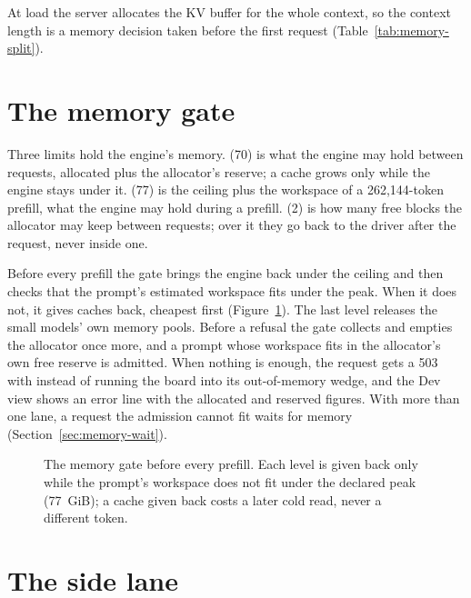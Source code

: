 At load the server allocates the KV buffer for the whole context, so the context length is a memory decision taken before the first request (Table~\ref{tab:memory-split}).

\section{The memory gate}\label{sec:memory-gate}

Three limits hold the engine's memory.  (70) is what the engine may hold between requests, allocated plus the allocator's reserve; a cache grows only while the engine stays under it.  (77) is the ceiling plus the workspace of a 262,144-token prefill, what the engine may hold during a prefill.  (2) is how many free blocks the allocator may keep between requests; over it they go back to the driver after the request, never inside one.

Before every prefill the gate brings the engine back under the ceiling and then checks that the prompt's estimated workspace fits under the peak. When it does not, it gives caches back, cheapest first (Figure~\ref{fig:memory-gate}). The last level releases the small models' own memory pools. Before a refusal the gate collects and empties the allocator once more, and a prompt whose workspace fits in the allocator's own free reserve is admitted. When nothing is enough, the request gets a 503 with  instead of running the board into its out-of-memory wedge, and the Dev view shows an error line with the allocated and reserved figures. With more than one lane, a request the admission cannot fit waits for memory (Section~\ref{sec:memory-wait}).

\begin{figure}[htbp]
\centering

\caption[The memory gate]{The memory gate before every prefill. Each level is given back only while the prompt's workspace does not fit under the declared peak (77~GiB); a cache given back costs a later cold read, never a different token.}\label{fig:memory-gate}
\end{figure}

\section{The side lane}\label{sec:side-lane}

